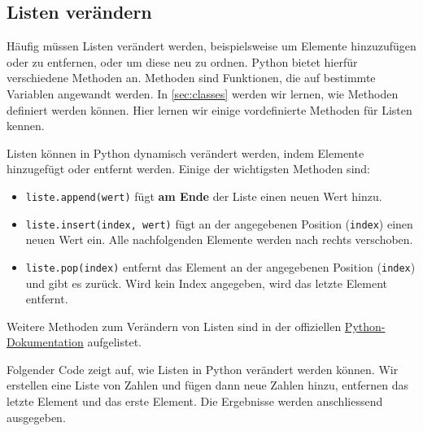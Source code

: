 \subsection{Listen verändern}

Häufig müssen Listen verändert werden, beispielsweise um Elemente hinzuzufügen oder zu entfernen, oder um diese neu zu ordnen. Python bietet hierfür verschiedene Methoden an. Methoden sind Funktionen, die auf bestimmte Variablen angewandt werden. In \ref{sec:classes} werden wir lernen, wie Methoden definiert werden können. Hier lernen wir einige vordefinierte Methoden für Listen kennen.

\begin{mydefinition}
	Listen können in Python dynamisch verändert werden, indem Elemente hinzugefügt oder entfernt werden. Einige der wichtigsten Methoden sind:
	\begin{itemize}
		\item \lstinline|liste.append(wert)| fügt \textbf{am Ende} der Liste einen neuen Wert hinzu.
		\item \lstinline|liste.insert(index, wert)| fügt an der angegebenen Position (\texttt{index}) einen neuen Wert ein. Alle nachfolgenden Elemente werden nach rechts verschoben.
		\item \lstinline|liste.pop(index)| entfernt das Element an der angegebenen Position (\texttt{index}) und gibt es zurück. Wird kein Index angegeben, wird das letzte Element entfernt.
	\end{itemize}
	Weitere Methoden zum Verändern von Listen sind in der offiziellen \href{https://docs.python.org/3/tutorial/datastructures.html#more-on-lists}{Python-Dokumentation} aufgelistet.
\end{mydefinition}


\begin{myexample}
	Folgender Code zeigt auf, wie Listen in Python verändert werden können. Wir erstellen eine Liste von Zahlen und fügen dann neue Zahlen hinzu, entfernen das letzte Element und das erste Element. Die Ergebnisse werden anschliessend ausgegeben.
	
\end{myexample}

